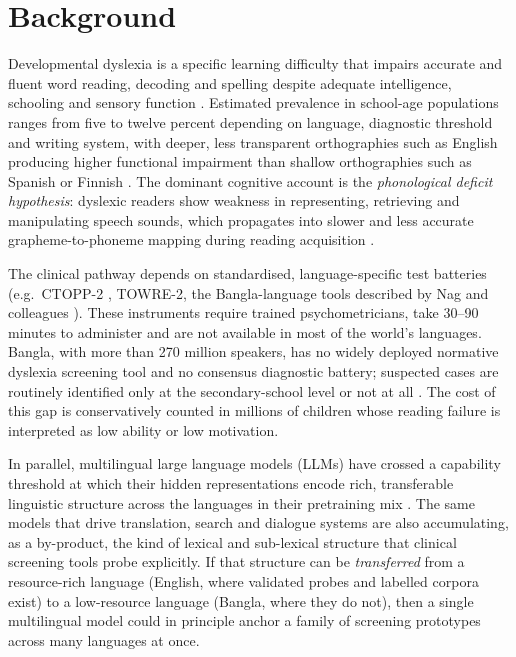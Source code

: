 \section{Background}

Developmental dyslexia is a specific learning difficulty that impairs accurate and fluent word reading, decoding and spelling despite adequate intelligence, schooling and sensory function \cite{snowling2020dyslexia,peterson2012developmental}. Estimated prevalence in school-age populations ranges from five to twelve percent depending on language, diagnostic threshold and writing system, with deeper, less transparent orthographies such as English producing higher functional impairment than shallow orthographies such as Spanish or Finnish \cite{ziegler2005reading,wagner2020prevalence}. The dominant cognitive account is the \emph{phonological deficit hypothesis}: dyslexic readers show weakness in representing, retrieving and manipulating speech sounds, which propagates into slower and less accurate grapheme-to-phoneme mapping during reading acquisition \cite{snowling2020dyslexia,goswami2011temporal}.

The clinical pathway depends on standardised, language-specific test batteries (e.g.\ CTOPP-2 \cite{wagner2013ctopp}, TOWRE-2, the Bangla-language tools described by Nag and colleagues \cite{nag2014dyslexia,nag2017indian}). These instruments require trained psychometricians, take 30--90 minutes to administer and are not available in most of the world's languages. Bangla, with more than 270 million speakers, has no widely deployed normative dyslexia screening tool and no consensus diagnostic battery; suspected cases are routinely identified only at the secondary-school level or not at all \cite{nag2014dyslexia,nag2017indian,badsha2024mall}. The cost of this gap is conservatively counted in millions of children whose reading failure is interpreted as low ability or low motivation.

In parallel, multilingual large language models (LLMs) have crossed a capability threshold at which their hidden representations encode rich, transferable linguistic structure across the languages in their pretraining mix \cite{conneau2020xlmr,scao2022bloom,dubey2024llama3,xue2021mt5}. The same models that drive translation, search and dialogue systems are also accumulating, as a by-product, the kind of lexical and sub-lexical structure that clinical screening tools probe explicitly. If that structure can be \emph{transferred} from a resource-rich language (English, where validated probes and labelled corpora exist) to a low-resource language (Bangla, where they do not), then a single multilingual model could in principle anchor a family of screening prototypes across many languages at once.

